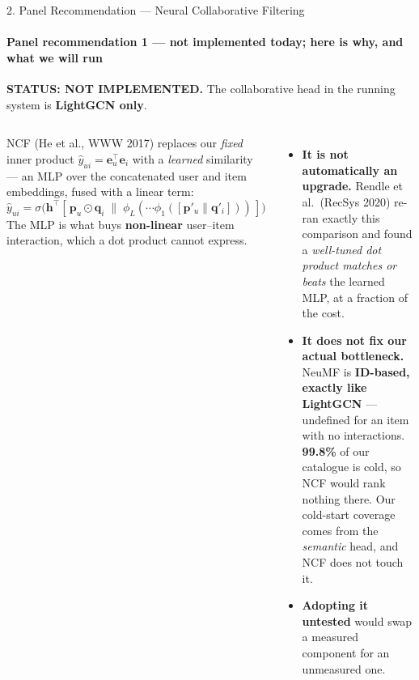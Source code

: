 \begin{frame}[shrink]{2. Panel Recommendation --- Neural Collaborative Filtering}
\framesubtitle{Panel recommendation 1 --- \textbf{not implemented today}; here is why, and what we will run}
\vspace{1mm}
{\scriptsize\colorbox{amritaAmber!12}{\parbox{0.975\linewidth}{\textbf{\textcolor{amritaAmber}{STATUS: NOT IMPLEMENTED.}} The collaborative head in the running system is \textbf{LightGCN only}.}}}
\vspace{2mm}
\begin{columns}[T]
{\scriptsize\eqs NCF (He et al., WWW 2017) replaces our \emph{fixed} inner product
$\hat y_{ui} = \mathbf{e}_u^{\top}\mathbf{e}_i$ with a \emph{learned} similarity --- an MLP over the
concatenated user and item embeddings, fused with a linear term:
\[ \hat y_{ui} = \sigma\big(\mathbf{h}^{\top}[\,\mathbf{p}_u \odot \mathbf{q}_i \;\|\; \phi_L(\cdots\phi_1([\mathbf{p}'_u \| \mathbf{q}'_i]))\,]\big) \]
The MLP is what buys \textbf{non-linear} user--item interaction, which a dot product cannot express.}
\vspace{2mm}

\begin{itemize}\scriptsize\setlength{\itemsep}{3.5pt}
  \item \textbf{It is not automatically an upgrade.} Rendle et al.\ (RecSys 2020) re-ran exactly this
        comparison and found a \emph{well-tuned dot product matches or beats} the learned MLP, at a
        fraction of the cost.
  \item \textbf{It does not fix our actual bottleneck.} NeuMF is \textbf{ID-based, exactly like
        LightGCN} --- undefined for an item with no interactions. \textbf{99.8\%} of our catalogue is
        cold, so NCF would rank nothing there. Our cold-start coverage comes from the \emph{semantic}
        head, and NCF does not touch it.
  \item \textbf{Adopting it untested} would swap a measured component for an unmeasured one.
\end{itemize}


\end{columns}
\end{frame}
